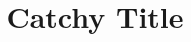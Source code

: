 \documentclass[11pt]{article}
\begin{document}
\title{Catchy Title}




%
%
%
%
%
%
%
%
%
\end{document}
